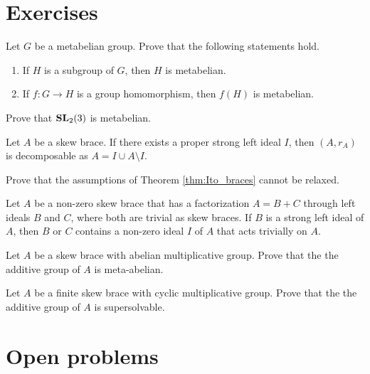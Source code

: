 \section{Exercises}

\begin{prob}
	Let $G$ be a metabelian group. Prove that the following statements hold. 
	\begin{enumerate}
		\item If $H$ is a subgroup of $G$, then $H$ is metabelian. 
		\item If $f\colon G\to H$ is a group homomorphism, then $f(H)$ is metabelian.
	\end{enumerate}
\end{prob}

\begin{prob}
	Prove that $\mathbf{SL}_2(3)$ is metabelian. 
\end{prob}


\begin{prob}
\label{prob:decomposable}
Let $A$ be a skew brace. If there exists a proper strong left ideal $I$, 
then $(A,r_A)$ is decomposable as $A = I \cup A\setminus I$. 
\end{prob}

\begin{prob}
\label{prob:Ito_relaxed}
Prove that the assumptions of Theorem \ref{thm:Ito_braces} cannot be relaxed. 
\end{prob}

\begin{prob}
\label{prob:Ito_version2}
Let $A$ be a non-zero skew brace that has a factorization $A=B+C$ through left ideals $B$ and $C$, where both are trivial as skew braces. If $B$ is a strong left ideal of $A$, then $B$ or $C$ contains a non-zero ideal $I$ of $A$ that acts trivially on $A$.
\end{prob}



\begin{prob}
\label{prob:mul_abelian}
Let $A$ be a skew brace with abelian multiplicative group. Prove that the 
the additive group of $A$ is meta-abelian. 
\end{prob}

\begin{prob}
\label{prob:mul_cyclic}
Let $A$ be a finite skew brace with cyclic multiplicative group. Prove that the 
the additive group of $A$ is supersolvable. 
\end{prob}

\section{Open problems}

